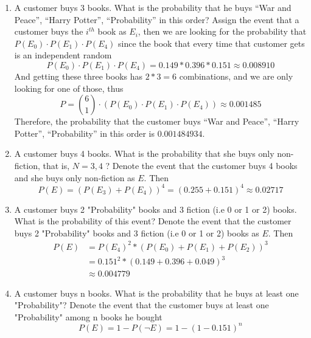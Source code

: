 \documentclass[preprint,12pt]{elsarticle}
\begin{document}
\begin{enumerate}[label=\alph*]
    \item A customer buys 3 books. What is the probability that he buys “War and Peace”, “Harry Potter”, 
    “Probability” in this order?
    Assign the event that a customer buys the $i^{th}$ book as $E_i$, then we are looking for the probability
    that $P(E_0) \cdot P(E_1) \cdot P(E_4)$ since the book that every time that customer gets is an independent random
    \begin{equation*}
        P(E_0) \cdot P(E_1) \cdot P(E_4) = 0.149 * 0.396 * 0.151 \approx 0.008910
    \end{equation*}
    And getting these three books has $2 * 3 = 6$ combinations, and we are only looking for one of those, thus
    \begin{equation*}
        P = \binom{6}{1} \cdot (P(E_0) \cdot P(E_1) \cdot P(E_4)) \approx 0.001485
    \end{equation*}
    Therefore, the probability that the customer buys “War and Peace”, “Harry Potter”, “Probability” in this order
    is $0.001484934$.

    \item A customer buys 4 books. What is the probability that she buys only non-fiction, that is, $N={3, 4}$
    ?
    Denote the event that the customer buys 4 books and she buys only non-fiction as $E$. Then
    \begin{equation*}
        P(E) = (P(E_3) + P(E_4))^4 = (0.255 + 0.151)^4 \approx 0.02717
    \end{equation*}

    \item A customer buys 2 "Probability" books and 3 fiction (i.e 0 or 1 or 2) books. What is the probability
    of this event?
    Denote the event that the customer buys 2 "Probability" books and 3 fiction (i.e 0 or 1 or 2) books as $E$. Then
    \begin{align*}
        P(E)    &= P(E_4)^2 * (P(E_0) + P(E_1) + P(E_2))^3 \\
                &= 0.151^2 * (0.149 + 0.396 + 0.049)^3 \\ 
                &\approx 0.004779
    \end{align*}

    \item A customer buys n books. What is the probability that he buys at least one "Probability"?
    Denote the event that the customer buys at least one "Probability" among n books he bought
    \begin{equation*}
        P(E) = 1 - P(\neg E) = 1 - (1 - 0.151)^n
    \end{equation*}
    \end{enumerate} 
\end{document}
